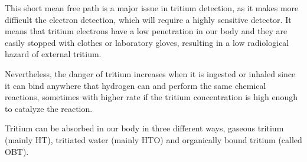 This short mean free path is a major issue in tritium detection, as it makes more difficult the electron detection, which will require a highly sensitive detector. It means that tritium electrons have a low penetration in our body and they are easily stopped with clothes or laboratory gloves, resulting in a low radiological hazard of external tritium.

Nevertheless, the danger of tritium increases when it is ingested or inhaled since it can bind anywhere that hydrogen can and perform the same chemical reactions, sometimes with higher rate if the tritium concentration is high enough to catalyze the reaction. 

Tritium can be absorbed in our body in three different ways, gaseous tritium (mainly HT), tritiated water (mainly HTO) and organically bound tritium (called OBT).

